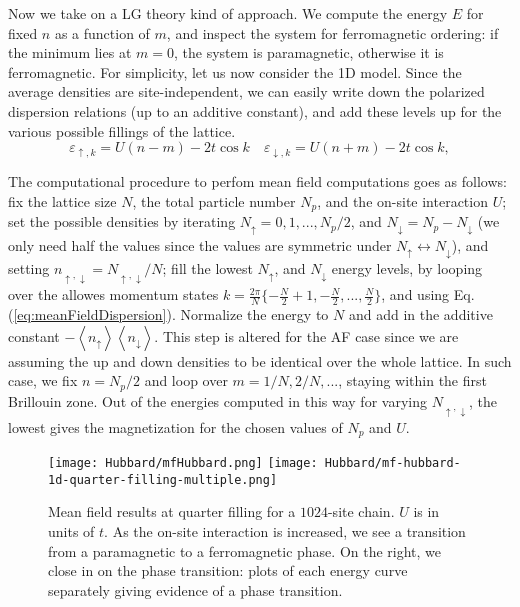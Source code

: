 Now we take on a \acl{LG} theory kind of approach.
We compute the energy $E$ for fixed $n$ as a function of $m$, and inspect the system for ferromagnetic ordering: if the minimum lies at $m = 0$, the system is paramagnetic, otherwise it is ferromagnetic.
For simplicity, let us now consider the \acs{1D} model.
Since the average densities are site-independent, we can easily write down the polarized dispersion relations (up to an additive constant), and add these levels up for the various possible fillings of the lattice.
\begin{equation}\label{eq:meanFieldDispersion}
\varepsilon_{\uparrow, k} = U ( n - m ) - 2 t \cos k \quad \varepsilon_{\downarrow, k} = U ( n + m ) - 2 t \cos k ,
\end{equation}

The computational procedure to perfom mean field computations goes as follows: fix the lattice size $N$, the total particle number $N_p$, and the on-site interaction $U$; set the possible densities by iterating $N_\uparrow = 0, 1, ..., N_p / 2$, and $N_\downarrow = N_p - N_\downarrow$ (we only need half the values since the values are symmetric under $ N_\uparrow \leftrightarrow N_\downarrow$), and setting $n_{\uparrow, \downarrow} = N_{\uparrow, \downarrow} / N$; fill the lowest $N_\uparrow$, and $N_\downarrow$ energy levels, by looping over the allowes momentum states $k = \frac{2\pi}{N} \{ -\frac{N}{2} + 1, -\frac{N}{2}, ..., \frac{N}{2} \}$, and using Eq.(\ref{eq:meanFieldDispersion}).
Normalize the energy to $N$ and add in the additive constant $- \left\langle n_\uparrow \right\rangle \left\langle n_\downarrow \right\rangle$.
This step is altered for the \acs{AF} case since we are assuming the up and down densities to be identical over the whole lattice.
In such case, we fix $n = N_p / 2$ and loop over $m = 1/ N, 2 / N,...$, staying within the first Brillouin zone.
Out of the energies computed in this way for varying $N_{\uparrow, \downarrow}$, the lowest gives the magnetization for the chosen values of $N_p$ and $U$.
\begin{figure}
\hspace{-3mm}
\texttt{[image: Hubbard/mfHubbard.png]}
\hspace{-2.5mm}
\texttt{[image: Hubbard/mf-hubbard-1d-quarter-filling-multiple.png]}
	\caption[Mean field results for the \acs{1D} Hubbard model.]{Mean field results at quarter filling for a $1024$-site chain.
	$U$ is in units of $t$.
	As the on-site interaction is increased, we see a transition from a paramagnetic to a ferromagnetic phase. On the right, we close in on the phase transition: plots of each energy curve separately giving evidence of a phase transition.}
	\label{fig:mft}
\end{figure}

